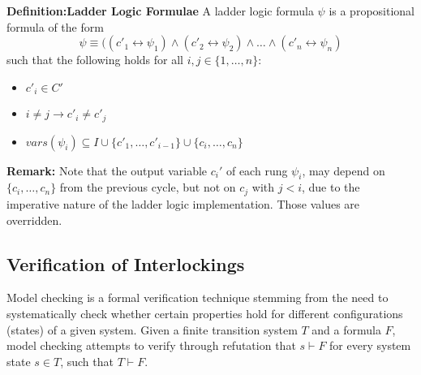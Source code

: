 \documentclass[conference,compsoc]{IEEEtran}
\begin{document}
\textbf{Definition:Ladder Logic Formulae}
A ladder logic formula $\psi$ is a propositional formula 
of the form
$$\psi \equiv ((c'_1 \leftrightarrow \psi_1) \wedge (c'_2 \leftrightarrow
\psi_2) \wedge  \ldots \wedge (c'_n \leftrightarrow \psi_n)$$ 
%
such that the following holds for all $i,j\in \{1,\ldots,n\}$:
\begin{itemize}
\item $c'_i \in C'$
\item $i \neq j \rightarrow c'_i \neq c'_j$
\item $vars(\psi_i) \subseteq I \cup  \{c'_1, \ldots, c'_{i-1} \} \cup \{ c_i, \ldots , c_n \}$
\end{itemize}


\textbf{Remark:} Note that the output variable $c_i'$
of  each rung $\psi_i$, may depend on  $\{ c_i, \ldots , c_n \}$ from the previous cycle, 
but not on $c_j$ with $j<i$, due to the imperative nature of the ladder logic implementation. 
Those values are overridden.



\subsection{Verification of Interlockings}

Model checking is a formal verification technique stemming from the need to systematically
check whether certain properties hold for different configurations (states) of a given system.
Given a finite transition system $T$ and a formula $F$, model checking attempts to verify through refutation that $s \vdash F$ for every system state $s \in T$, such that $T \vdash F$. 
\end{document}
